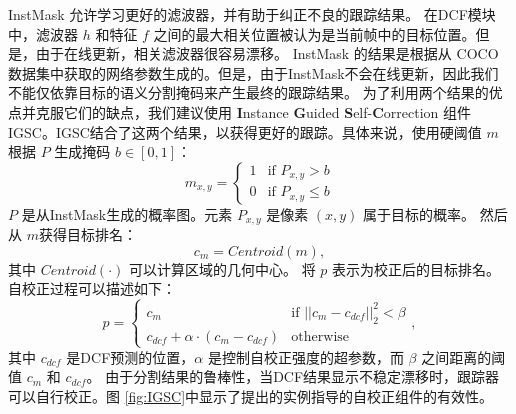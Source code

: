 InstMask 允许学习更好的滤波器，并有助于纠正不良的跟踪结果。
在DCF模块中，滤波器 $h$ 和特征 $f$ 之间的最大相关位置被认为是当前帧中的目标位置。但是，由于在线更新，相关滤波器很容易漂移。
InstMask 的结果是根据从 COCO 数据集中获取的网络参数生成的。但是，由于InstMask不会在线更新，因此我们不能仅依靠目标的语义分割掩码来产生最终的跟踪结果。
为了利用两个结果的优点并克服它们的缺点，我们建议使用 \textbf{I}nstance \textbf{G}uided \textbf{S}elf-\textbf{C}orrection 组件 IGSC。IGSC结合了这两个结果，以获得更好的跟踪。具体来说，使用硬阈值 $m$ 根据 $P$ 生成掩码 $b \in [0, 1] $：
\begin{equation}
m_{x,y} = \left\{ \begin{array}{ll}
 1 & \textrm{if $P_{x,y} > b$}\\
 0 & \textrm{if $P_{x,y} \le b$}
 \end{array} \right.
\end{equation}
$P$ 是从InstMask生成的概率图。元素 $P_{x,y}$ 是像素 $(x,y)$ 属于目标的概率。
然后从 $m$获得目标排名：
\begin{equation}
c_{m} = Centroid(m),
\end{equation}
其中 $Centroid(\mathord{\cdot})$ 可以计算区域的几何中心。
将 $p$ 表示为校正后的目标排名。
自校正过程可以描述如下：
\begin{equation}
p = \left\{ \begin{array}{ll}
 c_{m} & \textrm{if $||c_{m}-c_{dcf}||_2^2 < \beta$}\\
 c_{dcf} + \alpha \cdot (c_{m}-c_{dcf}) & \textrm{otherwise}
 \end{array} \right.,
\end{equation}
其中 $c_{dcf}$ 是DCF预测的位置，$\alpha$ 是控制自校正强度的超参数，而 $\beta$ 之间距离的阈值 $c_{m}$ 和 $c_{dcf}$。
由于分割结果的鲁棒性，当DCF结果显示不稳定漂移时，跟踪器可以自行校正。图 \ref{fig:IGSC}中显示了提出的实例指导的自校正组件的有效性。

